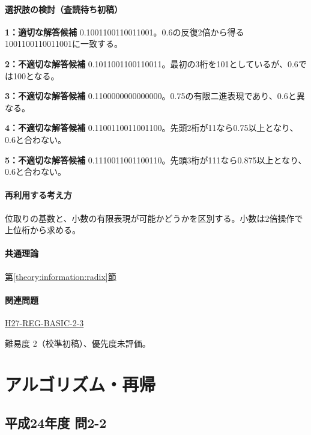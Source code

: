 \paragraph{選択肢の検討（査読待ち初稿）}\mbox{}\par

\noindent\textbf{1：適切な解答候補} 0.1001100110011001。0.6の反復2倍から得る1001100110011001に一致する。\par

\noindent\textbf{2：不適切な解答候補} 0.1011001100110011。最初の3桁を101としているが、0.6では100となる。\par

\noindent\textbf{3：不適切な解答候補} 0.1100000000000000。0.75の有限二進表現であり、0.6と異なる。\par

\noindent\textbf{4：不適切な解答候補} 0.1100110011001100。先頭2桁が11なら0.75以上となり、0.6と合わない。\par

\noindent\textbf{5：不適切な解答候補} 0.1110011001100110。先頭3桁が111なら0.875以上となり、0.6と合わない。\par

\paragraph{再利用する考え方} 位取りの基数と、小数の有限表現が可能かどうかを区別する。小数は2倍操作で上位桁から求める。

\paragraph{共通理論} \hyperref[theory:information:radix]{第\ref*{theory:information:radix}節}

\paragraph{関連問題} \hyperref[q:h27-reg-basic-2-3]{H27-REG-BASIC-2-3}

\par 難易度 2（校準初稿）、優先度未評価。

\section{アルゴリズム・再帰}

\subsection{平成24年度 問2-2}
\label{q:h24-reg-basic-2-2}

